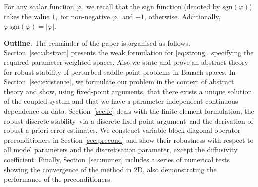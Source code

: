 \documentclass[11pt, reqno, a4paper, twoside]{article}
\numberwithin{equation}{section}
\numberwithin{remark}{section}
\numberwithin{figure}{section}
\numberwithin{table}{section}
\begin{document}
{For any scalar function \(\varphi,\) we recall that the sign function (denoted by \(\mathrm{sgn}(\varphi)\)) takes the value \(1,\) for non-negative \(\varphi,\) and \(-1\), otherwise. 
Additionally, \(\varphi\, \mathrm{sgn}(\varphi) = |\varphi|.\) 

\smallskip
\noindent\textbf{Outline.} The remainder of the paper is organised as follows. Section~\ref{sec:abstract} presents the weak formulation for \eqref{eq:strong}, specifying the required parameter-weighted spaces. Also we state and prove an abstract theory for robust stability of perturbed saddle-point problems in Banach spaces. In Section~\ref{sec:existence}, we formulate our problem in the context of abstract theory and show, using fixed-point arguments, that there exists a unique solution of the coupled system and that we have a parameter-independent continuous dependence on data. Section~\ref{sec:fe} deals with the finite element formulation, the robust discrete stability--via a discrete fixed-point argument--and the derivation of robust a priori error estimates. We construct variable block-diagonal operator preconditioners in Section \ref{sec:precond} and show their robustness with respect to all model parameters and the discretisation parameter,  except the diffusivity coefficient. Finally, Section~\ref{sec:numer} includes a series of numerical tests showing the  convergence of the method in 2D, also demonstrating the performance of the  preconditioners. 


}
\end{document}
